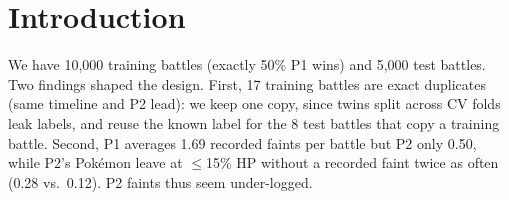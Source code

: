 \section{Introduction}
\label{sec:intro}
We have 10{,}000 training battles (exactly 50\% P1 wins) and 5{,}000 test battles.
Two findings shaped the design.
First, 17 training battles are exact duplicates (same timeline and P2 lead): we keep one copy, since twins split across CV folds leak labels, and reuse the known label for the 8 test battles that copy a training battle.
Second, P1 averages 1.69 recorded faints per battle but P2 only 0.50, while P2's Pok\'emon leave at $\leq$15\% HP without a recorded faint twice as often (0.28 vs.\ 0.12). P2 faints thus seem under-logged.

